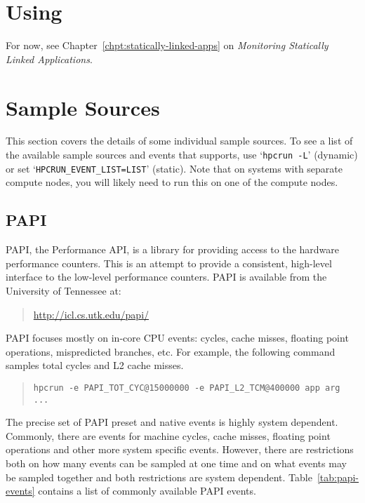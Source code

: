 
\section{Using \hpclink{}}

For now, see Chapter~\ref{chpt:statically-linked-apps} on {\it
Monitoring Statically Linked Applications}.


\section{Sample Sources}

This section covers the details of some individual sample sources.  To
see a list of the available sample sources and events that \hpcrun{}
supports, use `{\tt hpcrun -L}' (dynamic) or set
`\verb|HPCRUN_EVENT_LIST=LIST|' (static).  Note that on systems with
separate compute nodes, you will likely need to run this on one of the
compute nodes.

\subsection{PAPI}

PAPI, the Performance API, is a library for providing access to the
hardware performance counters.  This is an attempt to provide a
consistent, high-level interface to the low-level performance
counters.  PAPI is available from the University of Tennessee at:

\begin{quote}
\url{http://icl.cs.utk.edu/papi/}
\end{quote}

PAPI focuses mostly on in-core CPU events: cycles, cache misses,
floating point operations, mispredicted branches, etc.  For example,
the following command samples total cycles and L2 cache misses.

\begin{quote}
\begin{verbatim}
hpcrun -e PAPI_TOT_CYC@15000000 -e PAPI_L2_TCM@400000 app arg ...
\end{verbatim}
\end{quote}

The precise set of PAPI preset and native events is highly system
dependent.  Commonly, there are events for machine cycles, cache
misses, floating point operations and other more system specific
events.  However, there are restrictions both on how many events can
be sampled at one time and on what events may be sampled together and
both restrictions are system dependent.  Table~\ref{tab:papi-events}
contains a list of commonly available PAPI events.

